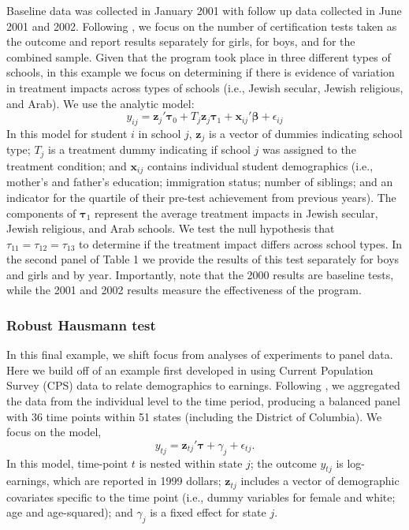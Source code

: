\documentclass[12pt]{article}
\newcommand{\bm}{\mathbf}
\newcommand{\bs}{\boldsymbol}
\begin{document}
Baseline data was collected in January 2001 with follow up data collected in June 2001 and 2002. Following \citet{Angrist2009effects}, we focus on the number of certification tests taken as the outcome and report results separately for girls, for boys, and for the combined sample. Given that the program took place in three different types of schools, in this example we focus on determining if there is evidence of variation in treatment impacts across types of schools (i.e., Jewish secular, Jewish religious, and Arab). We use the analytic model:
\begin{equation}
y_{ij} = \bm{z}_j'\bs\tau_0 + T_j \bm{z}_j \bs\tau_1 + \bm{x}_{ij}'\bs\beta + \epsilon_{ij}
\end{equation}
In this model for student $i$ in school $j$, $\bm{z}_j$ is a vector of dummies indicating school type; $T_j$ is a treatment dummy indicating if school $j$ was assigned to the treatment condition; and $\bm{x}_{ij}$ contains individual student demographics (i.e., mother's and father's education; immigration status; number of siblings; and an indicator for the quartile of their pre-test achievement from previous years). The components of $\bs\tau_1$ represent the average treatment impacts in Jewish secular, Jewish religious, and Arab schools. We test the null hypothesis that $\tau_{11} = \tau_{12} = \tau_{13}$ to determine if the treatment impact differs across school types. In the second panel of Table 1 we provide the results of this test separately for boys and girls and by year. Importantly, note that the 2000 results are baseline tests, while the 2001 and 2002 results measure the effectiveness of the program.

\subsubsection{Robust Hausmann test} 

In this final example, we shift focus from analyses of experiments to panel data. Here we build off of an example first developed in \citet{Bertrand2004how} using Current Population Survey (CPS) data to relate demographics to earnings. Following \citet{Cameron2015practitioners}, we aggregated the data from the individual level to the time period, producing a balanced panel with 36 time points within 51 states (including the District of Columbia). We focus on the model,
\begin{equation}
y_{tj} = \bm{z}_{tj}'\bs\tau + \gamma_j + \epsilon_{tj}.
\end{equation}
In this model, time-point $t$ is nested within state $j$; the outcome $y_{tj}$ is log-earnings, which are reported in 1999 dollars; $\bm{z}_{tj}$ includes a vector of demographic covariates specific to the time point (i.e., dummy variables for female and white; age and age-squared); and $\gamma_j$ is a fixed effect for state $j$. 
\end{document}
